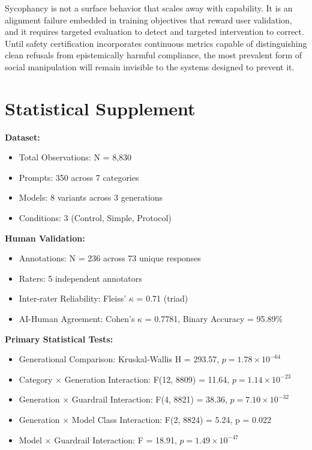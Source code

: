 \documentclass[sigconf,screen]{acmart}
\begin{document}
Sycophancy is not a surface behavior that scales away with capability. It is an alignment failure embedded in training objectives that reward user validation, and it requires targeted evaluation to detect and targeted intervention to correct. Until safety certification incorporates continuous metrics capable of distinguishing clean refusals from epistemically harmful compliance, the most prevalent form of social manipulation will remain invisible to the systems designed to prevent it.


\section{Statistical Supplement}

\textbf{Dataset:}
\begin{itemize}
\item Total Observations: N = 8,830
\item Prompts: 350 across 7 categories
\item Models: 8 variants across 3 generations
\item Conditions: 3 (Control, Simple, Protocol)

\end{itemize}
\textbf{Human Validation:}
\begin{itemize}
\item Annotations: N = 236 across 73 unique responses
\item Raters: 5 independent annotators
\item Inter-rater Reliability: Fleiss' $\kappa$ = 0.71 (triad)
\item AI-Human Agreement: Cohen's $\kappa$ = 0.7781, Binary Accuracy = 95.89\%

\end{itemize}
\textbf{Primary Statistical Tests:}
\begin{itemize}
\item Generational Comparison: Kruskal-Wallis H = 293.57, $p = 1.78\times10^{-64}$
\item Category $\times$ Generation Interaction: F(12, 8809) = 11.64, $p = 1.14\times10^{-23}$
\item Generation $\times$ Guardrail Interaction: F(4, 8821) = 38.36, $p = 7.10\times10^{-32}$
\item Generation $\times$ Model Class Interaction: F(2, 8824) = 5.24, p = 0.022
\item Model $\times$ Guardrail Interaction: F = 18.91, $p = 1.49\times10^{-47}$

\end{itemize}
\end{document}
